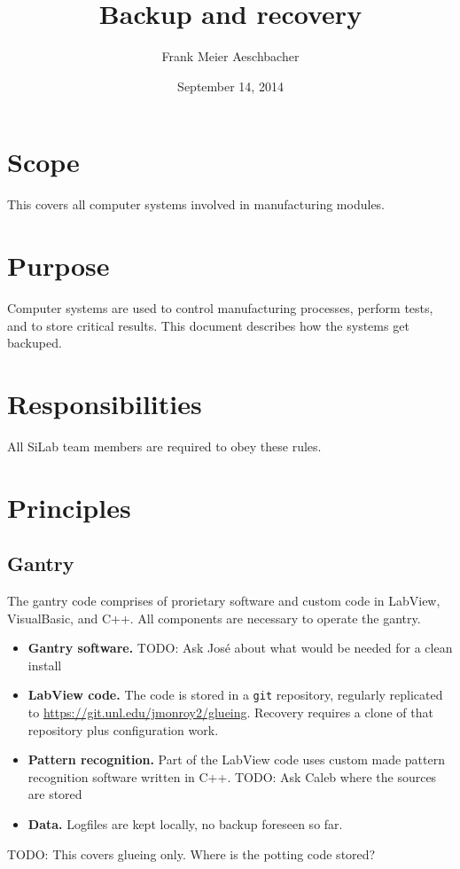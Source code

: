 \documentclass[12pt]{unlsilabsop}
\title{Backup and recovery}
\date{September 14, 2014}
\author{Frank Meier Aeschbacher}
\begin{document}
\maketitle

\section{Scope}
This covers all computer systems involved in manufacturing modules.

\section{Purpose}
Computer systems are used to control manufacturing processes, perform tests, and to store critical results. This document describes how the systems get backuped.


\section{Responsibilities}
All SiLab team members are required to obey these rules.

\section{Principles}

\subsection{Gantry}
The gantry code comprises of prorietary software and custom code in LabView, VisualBasic, and C++. All components are necessary to operate the gantry.
\begin{itemize}
    \item \textbf{Gantry software. } TODO: Ask José about what would be needed for a clean install
    \item \textbf{LabView code.} The code is stored in a \texttt{git} repository, regularly replicated to \url{https://git.unl.edu/jmonroy2/glueing}. Recovery requires a clone of that repository plus configuration work.
    \item \textbf{Pattern recognition.} Part of the LabView code uses custom made pattern recognition software written in C++. TODO: Ask Caleb where the sources are stored
    \item \textbf{Data.} Logfiles are kept locally, no backup foreseen so far.
\end{itemize}
TODO: This covers glueing only. Where is the potting code stored?
\end{document}

